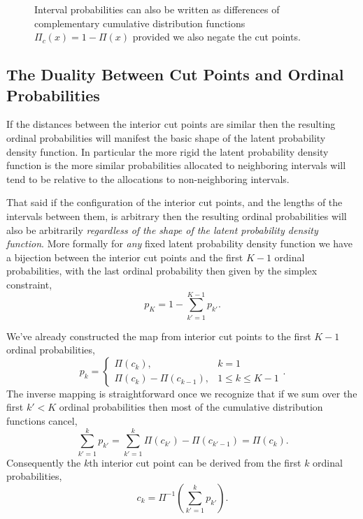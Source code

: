 \documentclass[
  letterpaper,
  DIV=11,
  numbers=noendperiod]{scrartcl}
\begin{document}
\begin{figure}


\caption{\label{fig-ccdf-calcs}Interval probabilities can also be
written as differences of complementary cumulative distribution
functions \(\Pi_{c}(x) = 1 - \Pi(x)\) provided we also negate the cut
points.}

\end{figure}%

\subsection{The Duality Between Cut Points and Ordinal
Probabilities}\label{sec:duality}

If the distances between the interior cut points are similar then the
resulting ordinal probabilities will manifest the basic shape of the
latent probability density function. In particular the more rigid the
latent probability density function is the more similar probabilities
allocated to neighboring intervals will tend to be relative to the
allocations to non-neighboring intervals.

That said if the configuration of the interior cut points, and the
lengths of the intervals between them, is arbitrary then the resulting
ordinal probabilities will also be arbitrarily \emph{regardless of the
shape of the latent probability density function}. More formally for
\emph{any} fixed latent probability density function we have a bijection
between the interior cut points and the first \(K - 1\) ordinal
probabilities, with the last ordinal probability then given by the
simplex constraint, \[
p_{K} = 1 - \sum_{k' = 1}^{K - 1} p_{k'}.
\]

We've already constructed the map from interior cut points to the first
\(K - 1\) ordinal probabilities, \[
p_{k}
=
\left\{
\begin{array}{rr}
\Pi(c_{k}), & k = 1 \\
\Pi(c_{k}) - \Pi(c_{k - 1}), & 1 \le k \le K - 1
\end{array}
\right. .
\] The inverse mapping is straightforward once we recognize that if we
sum over the first \(k' < K\) ordinal probabilities then most of the
cumulative distribution functions cancel, \[
\sum_{k' = 1}^{k} p_{k'}
=
\sum_{k' = 1}^{k} \Pi(c_{k'}) - \Pi(c_{k' - 1})
=
\Pi(c_{k}).
\] Consequently the \(k\)th interior cut point can be derived from the
first \(k\) ordinal probabilities, \[
c_{k} = \Pi^{-1} \left( \sum_{k' = 1}^{k} p_{k'} \right).
\]
\end{document}

